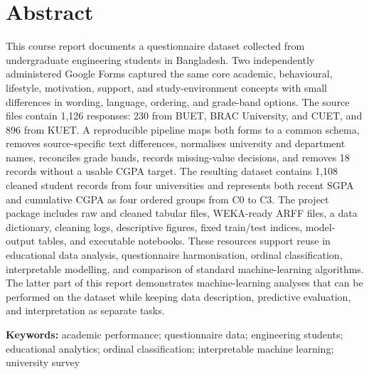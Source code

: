 \section*{Abstract}
This course report documents a questionnaire dataset collected from undergraduate engineering students in Bangladesh. Two independently administered Google Forms captured the same core academic, behavioural, lifestyle, motivation, support, and study-environment concepts with small differences in wording, language, ordering, and grade-band options. The source files contain 1,126 responses: 230 from BUET, BRAC University, and CUET, and 896 from KUET. A reproducible pipeline maps both forms to a common schema, removes source-specific text differences, normalises university and department names, reconciles grade bands, records missing-value decisions, and removes 18 records without a usable CGPA target. The resulting dataset contains 1,108 cleaned student records from four universities and represents both recent SGPA and cumulative CGPA as four ordered groups from C0 to C3. The project package includes raw and cleaned tabular files, WEKA-ready ARFF files, a data dictionary, cleaning logs, descriptive figures, fixed train/test indices, model-output tables, and executable notebooks. These resources support reuse in educational data analysis, questionnaire harmonisation, ordinal classification, interpretable modelling, and comparison of standard machine-learning algorithms. The latter part of this report demonstrates machine-learning analyses that can be performed on the dataset while keeping data description, predictive evaluation, and interpretation as separate tasks.

\textbf{Keywords:} academic performance; questionnaire data; engineering students; educational analytics; ordinal classification; interpretable machine learning; university survey

